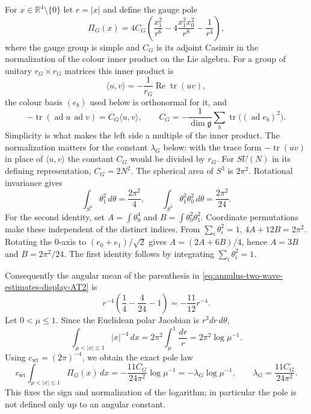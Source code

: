 For $x\in\mathbb R^4\setminus\{0\}$ let $r=|x|$ and define the gauge pole
\begin{equation}
 \Pi_G(x)=4C_G\left(
   \frac{x_1^2}{r^6}-4\frac{x_1^2x_0^2}{r^8}-\frac1{r^4}
 \right),
 \label{eq:annulus-two-wave-estimates-display-AT2}
\end{equation}
where the gauge group is simple and $C_G$ is its adjoint Casimir in the
normalization of the colour inner product on the Lie algebra. For a
group of unitary $r_G\times r_G$ matrices this inner product is
\[
 \langle u,v\rangle=-\frac1{r_G}\operatorname{Re}\operatorname{tr}(uv),
\]
the colour basis $(e_b)$ used below is orthonormal for it, and
\[
 -\operatorname{tr}(\operatorname{ad}u\,\operatorname{ad}v)
                =C_G\langle u,v\rangle,
 \qquad
 C_G=-\frac1{\dim\mathfrak g}\sum_b
       \operatorname{tr}\bigl((\operatorname{ad}e_b)^2\bigr).
\]
Simplicity is what makes the left side a multiple of the inner product.
The normalization matters for the constant $\lambda_G$ below: with the
trace form $-\operatorname{tr}(uv)$ in place of $\langle u,v\rangle$
the constant $C_G$ would be divided by $r_G$. For $SU(N)$ in its
defining representation, $C_G=2N^2$.
The spherical area of $S^3$ is $2\pi^2$. Rotational invariance gives
\begin{equation}
 \int_{S^3}\theta_1^2\,d\theta=\frac{2\pi^2}{4},\qquad
 \int_{S^3}\theta_1^2\theta_0^2\,d\theta=\frac{2\pi^2}{24}.
 \label{eq:annulus-two-wave-estimates-display-AT3}
\end{equation}
For the second identity, set $A=\int\theta_0^4$ and
$B=\int\theta_0^2\theta_1^2$. Coordinate permutations make these
independent of the distinct indices. From $\sum_i\theta_i^2=1$,
$4A+12B=2\pi^2$. Rotating the $0$-axis to
$(e_0+e_1)/\sqrt2$ gives $A=(2A+6B)/4$, hence $A=3B$ and
$B=2\pi^2/24$. The first identity follows by integrating
$\sum_i\theta_i^2=1$.

Consequently the angular mean of the parenthesis in \eqref{eq:annulus-two-wave-estimates-display-AT2} is
\[
 r^{-4}\left(\frac14-\frac4{24}-1\right)
       =-\frac{11}{12}r^{-4}.
\]
Let $0<\mu\leq1$. Since the Euclidean polar Jacobian is
$r^3dr\,d\theta$,
\[
 \int_{\mu<|x|\leq1}|x|^{-4}\,dx
       =2\pi^2\int_\mu^1\frac{dr}{r}
       =2\pi^2\log\mu^{-1}.
\]
Using $c_{\mathrm{wt}}=(2\pi)^{-4}$, we obtain the exact pole law
\begin{equation}
 c_{\mathrm{wt}}\int_{\mu<|x|\leq1}\Pi_G(x)\,dx
 =-\frac{11C_G}{24\pi^2}\log\mu^{-1}
 =-\lambda_G\log\mu^{-1},
 \qquad \lambda_G=\frac{11C_G}{24\pi^2}.
 \label{eq:annulus-two-wave-estimates-display-AT4}
\end{equation}
This fixes the sign and normalization of the logarithm; in particular the
pole is not defined only up to an angular constant.

